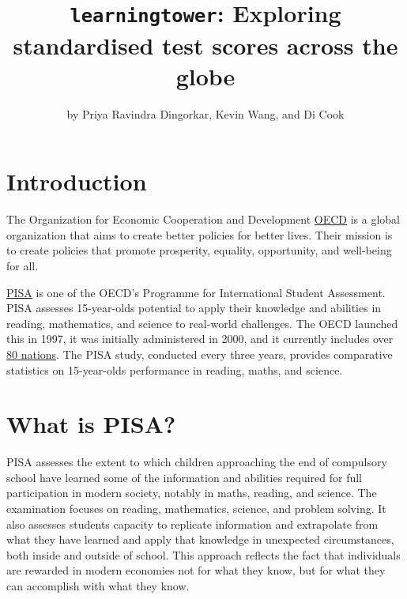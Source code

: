 \title{\texttt{learningtower}: Exploring standardised test scores across
the globe}
\author{by Priya Ravindra Dingorkar, Kevin Wang, and Di Cook}

\maketitle


\hypertarget{introduction}{%
\section{Introduction}\label{introduction}}

The Organization for Economic Cooperation and Development
\href{OECD\%20-\%20https://www.oecd.org/about/}{OECD} is a global
organization that aims to create better policies for better lives. Their
mission is to create policies that promote prosperity, equality,
opportunity, and well-being for all.

\href{PISA\%20-\%20https://www.oecd.org/pisa/}{PISA} is one of the
OECD's Programme for International Student Assessment. PISA assesses
15-year-olds potential to apply their knowledge and abilities in
reading, mathematics, and science to real-world challenges. The OECD
launched this in 1997, it was initially administered in 2000, and it
currently includes over
\href{https://www.oecd.org/pisa/aboutpisa/pisa-participants.htm}{80
nations}. The PISA study, conducted every three years, provides
comparative statistics on 15-year-olds performance in reading, maths,
and science.

\hypertarget{what-is-pisa}{%
\section{What is PISA?}\label{what-is-pisa}}

PISA assesses the extent to which children approaching the end of
compulsory school have learned some of the information and abilities
required for full participation in modern society, notably in maths,
reading, and science. The examination focuses on reading, mathematics,
science, and problem solving. It also assesses students capacity to
replicate information and extrapolate from what they have learned and
apply that knowledge in unexpected circumstances, both inside and
outside of school. This approach reflects the fact that individuals are
rewarded in modern economies not for what they know, but for what they
can accomplish with what they know.

